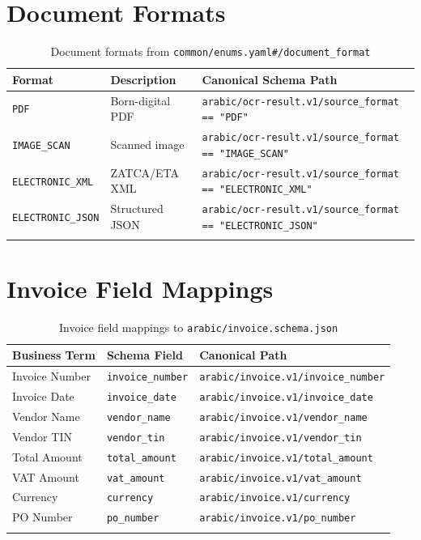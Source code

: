 \documentclass[11pt,a4paper]{report}
\newcommand{\schemapath}[1]{\texttt{\textcolor{pathcolor}{#1}}}
\newcommand{\enumval}[1]{\texttt{\textcolor{sapgreen}{#1}}}
\newcommand{\fieldref}[1]{\texttt{\textcolor{sapblue}{#1}}}
\begin{document}
\section{Document Formats}

\begin{longtable}{@{}p{3.5cm}p{3cm}p{5.5cm}@{}}
\toprule
\textbf{Format} & \textbf{Description} & \textbf{Canonical Schema Path} \\
\midrule
\endhead
\enumval{PDF} & Born-digital PDF & \schemapath{arabic/ocr-result.v1/source\_format == "PDF"} \\
\enumval{IMAGE\_SCAN} & Scanned image & \schemapath{arabic/ocr-result.v1/source\_format == "IMAGE\_SCAN"} \\
\enumval{ELECTRONIC\_XML} & ZATCA/ETA XML & \schemapath{arabic/ocr-result.v1/source\_format == "ELECTRONIC\_XML"} \\
\enumval{ELECTRONIC\_JSON} & Structured JSON & \schemapath{arabic/ocr-result.v1/source\_format == "ELECTRONIC\_JSON"} \\
\bottomrule
\caption{Document formats from \schemapath{common/enums.yaml\#/document\_format}}
\end{longtable}

\section{Invoice Field Mappings}

\begin{longtable}{@{}p{3cm}p{4cm}p{5cm}@{}}
\toprule
\textbf{Business Term} & \textbf{Schema Field} & \textbf{Canonical Path} \\
\midrule
\endhead
Invoice Number & \fieldref{invoice\_number} & \schemapath{arabic/invoice.v1/invoice\_number} \\
Invoice Date & \fieldref{invoice\_date} & \schemapath{arabic/invoice.v1/invoice\_date} \\
Vendor Name & \fieldref{vendor\_name} & \schemapath{arabic/invoice.v1/vendor\_name} \\
Vendor TIN & \fieldref{vendor\_tin} & \schemapath{arabic/invoice.v1/vendor\_tin} \\
Total Amount & \fieldref{total\_amount} & \schemapath{arabic/invoice.v1/total\_amount} \\
VAT Amount & \fieldref{vat\_amount} & \schemapath{arabic/invoice.v1/vat\_amount} \\
Currency & \fieldref{currency} & \schemapath{arabic/invoice.v1/currency} \\
PO Number & \fieldref{po\_number} & \schemapath{arabic/invoice.v1/po\_number} \\
\bottomrule
\caption{Invoice field mappings to \schemapath{arabic/invoice.schema.json}}
\end{longtable}
\end{document}
